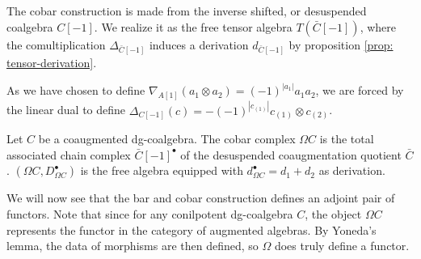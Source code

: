 \documentclass[../thesis.tex]{subfiles}
\begin{document}
            \begin{center}

            \end{center}
            
            The cobar construction is made from the inverse shifted, or desuspended coalgebra $C[-1]$. We realize it as the free tensor algebra $T(\bar{C}[-1])$, where the comultiplication $\Delta_{\bar{C}[-1]}$ induces a derivation $d_{\bar{C}[-1]}$ by proposition \ref{prop: tensor-derivation}.

            \begin{remark}
                As we have chosen to define $\nabla_{A[1]}(a_1\otimes a_2)=(-1)^{|a_1|}a_1a_2$, we are forced by the linear dual to define $\Delta_{C[-1]}(c)=-(-1)^{|c_{(1)}|}c_{(1)}\otimes c_{(2)}$.
            \end{remark}

            \begin{proposition}
                Let $C$ be a coaugmented dg-coalgebra. The cobar complex $\Omega C$ is the total associated chain complex $\bar{C}[-1]^\bullet$ of the desuspended coaugmentation quotient $\bar{C}$. $(\Omega C, D_{\Omega C}^\bullet)$ is the free algebra equipped with $d_{\Omega C}^\bullet = d_1 + d_2$ as derivation.
            \end{proposition}

            We will now see that the bar and cobar construction defines an adjoint pair of functors. Note that since for any conilpotent dg-coalgebra $C$, the object $\Omega C$ represents the functor in the category of augmented algebras. By Yoneda's lemma, the data of morphisms are then defined, so $\Omega$ does truly define a functor.
\end{document}
